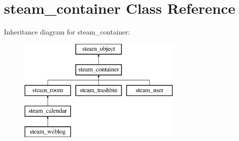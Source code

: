 \hypertarget{classsteam__container}{
\section{steam\_\-container Class Reference}
\label{classsteam__container}
}
Inheritance diagram for steam\_\-container:\begin{figure}[H]
\begin{center}
\leavevmode
\includegraphics[height=5.000000cm]{classsteam__container}
\end{center}
\end{figure}
